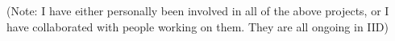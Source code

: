 \documentclass{article}
\begin{document}
(Note: I have either personally been involved in all of the above projects, or I have collaborated with people working on them.  They are all ongoing in IID)



\begin{figure}[t]
	\centering
\end{figure}
\end{document}
